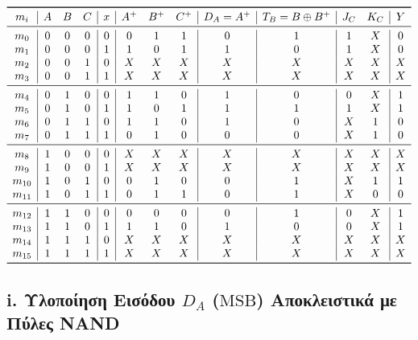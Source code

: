 \documentclass[11pt, a4paper]{article}
\begin{document}
\[
\begin{array}{c|ccc|c|ccc|c|c|cc|c}
\toprule
m_i & A & B & C & x & A^+ & B^+ & C^+ & D_A = A^+ & T_B = B \oplus B^+ & J_C & K_C & Y \\
\midrule
m_0 & 0 & 0 & 0 & 0 & 0 & 1 & 1 & 0 & 1 & 1 & X & 0 \\
m_1 & 0 & 0 & 0 & 1 & 1 & 0 & 1 & 1 & 0 & 1 & X & 0 \\
m_2 & 0 & 0 & 1 & 0 & X & X & X & X & X & X & X & X \\
m_3 & 0 & 0 & 1 & 1 & X & X & X & X & X & X & X & X \\
\midrule
m_4 & 0 & 1 & 0 & 0 & 1 & 1 & 0 & 1 & 0 & 0 & X & 1 \\
m_5 & 0 & 1 & 0 & 1 & 1 & 0 & 1 & 1 & 1 & 1 & X & 1 \\
m_6 & 0 & 1 & 1 & 0 & 1 & 1 & 0 & 1 & 0 & X & 1 & 0 \\
m_7 & 0 & 1 & 1 & 1 & 0 & 1 & 0 & 0 & 0 & X & 1 & 0 \\
\midrule
m_8 & 1 & 0 & 0 & 0 & X & X & X & X & X & X & X & X \\
m_9 & 1 & 0 & 0 & 1 & X & X & X & X & X & X & X & X \\
m_{10} & 1 & 0 & 1 & 0 & 0 & 1 & 0 & 0 & 1 & X & 1 & 1 \\
m_{11} & 1 & 0 & 1 & 1 & 0 & 1 & 1 & 0 & 1 & X & 0 & 0 \\
\midrule
m_{12} & 1 & 1 & 0 & 0 & 0 & 0 & 0 & 0 & 1 & 0 & X & 1 \\
m_{13} & 1 & 1 & 0 & 1 & 1 & 1 & 0 & 1 & 0 & 0 & X & 1 \\
m_{14} & 1 & 1 & 1 & 0 & X & X & X & X & X & X & X & X \\
m_{15} & 1 & 1 & 1 & 1 & X & X & X & X & X & X & X & X \\
\bottomrule
\end{array}
\]

\subsection*{i. Υλοποίηση Εισόδου $D_A$ ($\text{MSB}$) Αποκλειστικά με Πύλες NAND}
\end{document}
